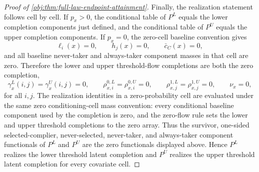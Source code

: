 \begin{proof}[Proof of \cref{obj:thm:full-law-endpoint-attainment}]
Finally, the realization statement follows cell by cell.  If \(p_x>0\), the conditional table of \(P^L\) equals the lower completion components just defined, and the conditional table of \(P^U\) equals the upper completion components. %
If \(p_x=0\), the zero-cell baseline convention gives
\[
\ell_i(x)=0,\qquad h_j(x)=0,\qquad \bar c_C(x)=0,
\]
and all baseline never-taker and always-taker component masses in that cell are zero.  Therefore the lower and upper threshold-flow completions are both the zero completion,
\[
\gamma^L_x(i,j)=\gamma^U_x(i,j)=0,\qquad
\rho^{0,L}_{x,i}=\rho^{0,U}_{x,i}=0,\qquad
\rho^{1,L}_{x,j}=\rho^{1,U}_{x,j}=0,
\qquad
\nu_x=0,
\]
for all \(i,j\).  The realization identities in a zero-probability cell are evaluated under the same zero conditioning-cell mass convention: every conditional baseline component used by the completion is zero, and the zero-flow rule sets the lower and upper threshold completions to the zero array.  Thus the survivor, one-sided selected-complier, never-selected, never-taker, and always-taker component functionals of \(P^L\) and \(P^U\) are the zero functionals displayed above. %
Hence \(P^L\) realizes the lower threshold latent completion and \(P^U\) realizes the upper threshold latent completion for every covariate cell. %
\end{proof}

